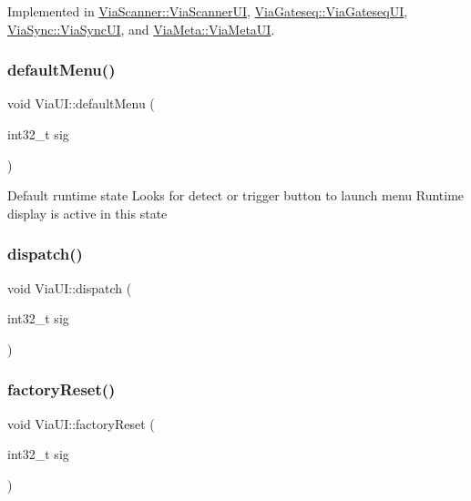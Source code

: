 Implemented in \mbox{\hyperlink{class_via_scanner_1_1_via_scanner_u_i_adc8f206d1050c457af29a45cf8050faf}{Via\+Scanner\+::\+Via\+Scanner\+UI}}, \mbox{\hyperlink{class_via_gateseq_1_1_via_gateseq_u_i_ad71d38b0b6b8c29e9f93e0fe6d2c40fc}{Via\+Gateseq\+::\+Via\+Gateseq\+UI}}, \mbox{\hyperlink{class_via_sync_1_1_via_sync_u_i_a53dbd5157906ae81c3d54a56eafbf06e}{Via\+Sync\+::\+Via\+Sync\+UI}}, and \mbox{\hyperlink{class_via_meta_1_1_via_meta_u_i_a632c291b811cf6e704e913060083dd7d}{Via\+Meta\+::\+Via\+Meta\+UI}}.

\mbox{\label{class_via_u_i_af80f2151bdd13bc6e84517064100ed92}} 
\subsubsection{\texorpdfstring{default\+Menu()}{defaultMenu()}}
{\footnotesize\ttfamily void Via\+U\+I\+::default\+Menu (\begin{DoxyParamCaption}\item[{int32\+\_\+t}]{sig }\end{DoxyParamCaption})}

Default runtime state Looks for detect or trigger button to launch menu Runtime display is active in this state \mbox{\label{class_via_u_i_ae8bb5e76df4a1b3c1127829bd1be21f7}} 
\subsubsection{\texorpdfstring{dispatch()}{dispatch()}}
{\footnotesize\ttfamily void Via\+U\+I\+::dispatch (\begin{DoxyParamCaption}\item[{int32\+\_\+t}]{sig }\end{DoxyParamCaption})}

\mbox{\label{class_via_u_i_a04eb56786faec693ef8cbf4d41384ca1}} 
\subsubsection{\texorpdfstring{factory\+Reset()}{factoryReset()}}
{\footnotesize\ttfamily void Via\+U\+I\+::factory\+Reset (\begin{DoxyParamCaption}\item[{int32\+\_\+t}]{sig }\end{DoxyParamCaption})}

